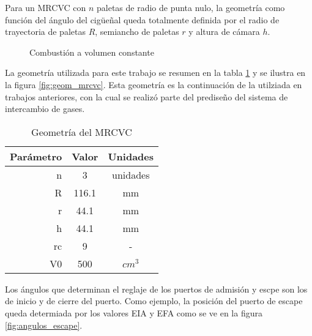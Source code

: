 %
Para un MRCVC con $n$ paletas de radio de punta nulo, la geometría como función
del ángulo del cigüeñal queda totalmente definida por el radio de trayectoria
de paletas $R$, semiancho de paletas $r$ y altura de cámara $h$.

\begin{figure}
    \centering
    \caption{Combustión a volumen constante}
    \label{fig:vol_constante}
\end{figure}

La geometría utilizada para este trabajo se resumen en la tabla
\ref{tab:geom_mrcvc} y se ilustra en la figura \ref{fig:geom_mrcvc}.
%
Esta geometría es la continuación de la utilziada en trabajos anteriores, con
la cual se realizó parte del prediseño del sistema de intercambio de gases.

\begin{table}
    \centering
    \begin{tabular}{rcc} \toprule
        Parámetro & Valor & Unidades \\ \midrule
        n & 3 & unidades \\
        R & 116.1 & mm \\
        r & 44.1 & mm \\
        h & 44.1 & mm \\
        rc & 9 & - \\
        V0 & 500 & $cm^3$ \\
    \end{tabular}
    \caption{Geometría del MRCVC}
    \label{tab:geom_mrcvc}
\end{table}


Los ángulos que determinan el reglaje de los puertos de admisión y escpe
son los de inicio y de cierre del puerto.
%
Como ejemplo, la posición del puerto de escape queda determiada por los 
valores EIA y EFA como se ve en la figura \ref{fig:angulos_escape}.

